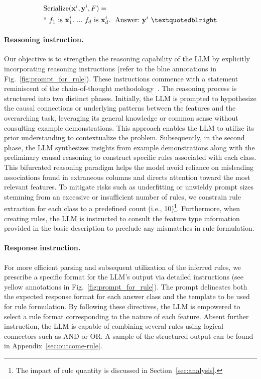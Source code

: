 \begin{align}
&\text{Serialize}(\mathbf{x}^i,\mathbf{y}^i, F) = \nonumber \\ 
&``\ f_1\ \text{is}\ \mathbf{x}^i_1.\ ... \ f_d\  \text{is}\  \mathbf{x}^i_d.\ \ \text{Answer:}\  \mathbf{y}^i\ ”
\end{align}

\vspace*{-0.12in}
\paragraph{Reasoning instruction.} Our objective is to strengthen the reasoning capability of the LLM by explicitly incorporating reasoning instructions (refer to the blue annotations in Fig.~\ref{fig:prompt_for_rule}). These instructions commence with a statement reminiscent of the chain-of-thought methodology~\cite{wei2022chain}. The reasoning process is structured into two distinct phases. Initially, the LLM is prompted to hypothesize the causal connections or underlying patterns between the features and the overarching task, leveraging its general knowledge or common sense without consulting example demonstrations. This approach enables the LLM to utilize its prior understanding to contextualize the problem. Subsequently, in the second phase, the LLM synthesizes insights from example demonstrations along with the preliminary causal reasoning to construct specific rules associated with each class. This bifurcated reasoning paradigm helps the model avoid reliance on misleading associations found in extraneous columns and directs attention toward the most relevant features. To mitigate risks such as underfitting or unwieldy prompt sizes stemming from an excessive or insufficient number of rules, we constrain rule extraction for each class to a predefined count (i.e., 10)\footnote{The impact of rule quantity is discussed in Section~\ref{sec:analysis}.}. Furthermore, when creating rules, the LLM is instructed to consult the feature type information provided in the basic description to preclude any mismatches in rule formulation.

\vspace*{-0.12in}
\paragraph{Response instruction.} For more efficient parsing and subsequent utilization of the inferred rules, we prescribe a specific format for the LLM's output via detailed instructions (see yellow annotations in Fig.~\ref{fig:prompt_for_rule}). The prompt delineates both the expected response format for each answer class and the template to be used for rule formulation. By following these directives, the LLM is empowered to select a rule format corresponding to the nature of each feature. Absent further instruction, the LLM is capable of combining several rules using logical connectors such as AND or OR. A sample of the structured output can be found in Appendix~\ref{sec:outcome-rule}.

